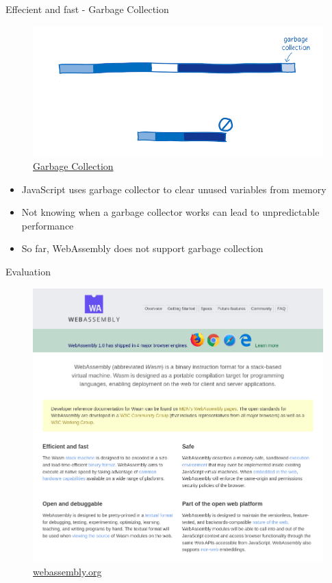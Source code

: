 \documentclass{beamer}
\begin{document}
\begin{frame}{Effecient and fast - Garbage Collection}
   \begin{figure}
        \includegraphics[scale=0.2]{./images/garbage.png}
        \caption{\href{https://www.smashingmagazine.com/2017/05/abridged-cartoon-introduction-webassembly/}{Garbage Collection}}
    \end{figure} 
    \begin{itemize}
        \item JavaScript uses garbage collector to clear unused variables from memory 
        \item Not knowing when a garbage collector works can lead to unpredictable performance
        \item So far, WebAssembly does not support garbage collection
    \end{itemize}
\end{frame}

\begin{frame}{Evaluation}
    \begin{figure}
        \includegraphics[scale=0.2]{./images/webassembly_org.png}
        \caption{\href{https://webassembly.org/}{webassembly.org}}
    \end{figure}
\end{frame}
\end{document}
